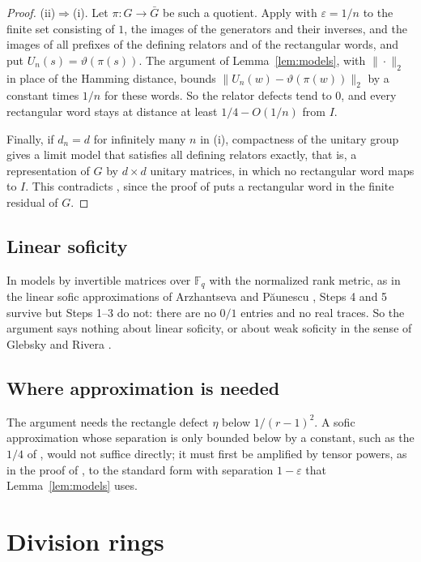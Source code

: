\documentclass[11pt]{article}
\theoremstyle{definition}
\theoremstyle{remark}
\numberwithin{equation}{section}
\newcommand{\F}{\mathbb F}
\newcommand{\eps}{\varepsilon}
\begin{document}
\begin{proof}
(ii)$\Rightarrow$(i). Let $\pi\colon G\to\bar G$ be such a quotient. Apply \cite[Theorem~3.6]{Pestov2008} with $\eps=1/n$ to the finite set consisting of $1$, the images of the generators and their inverses, and the images of all prefixes of the defining relators and of the rectangular words, and put $U_n(s)=\vartheta(\pi(s))$. The argument of Lemma~\ref{lem:models}, with $\|\cdot\|_2$ in place of the Hamming distance, bounds $\|U_n(w)-\vartheta(\pi(w))\|_2$ by a constant times $1/n$ for these words. So the relator defects tend to $0$, and every rectangular word stays at distance at least $1/4-O(1/n)$ from $I$.

Finally, if $d_n=d$ for infinitely many $n$ in (i), compactness of the unitary group gives a limit model that satisfies all defining relators exactly, that is, a representation of $G$ by $d\times d$ unitary matrices, in which no rectangular word maps to $I$. This contradicts \cite[Corollary~1.2]{OAI252}, since the proof of \cite[Theorem~1.1]{OAI252} puts a rectangular word in the finite residual of $G$.
\end{proof}

\subsection{Linear soficity}

 In models by invertible matrices over $\F_q$ with the normalized rank metric, as in the linear sofic approximations of Arzhantseva and P\u{a}unescu \cite{ArzhantsevaPaunescu2017}, Steps 4 and 5 survive but Steps 1--3 do not: there are no $0/1$ entries and no real traces. So the argument says nothing about linear soficity, or about weak soficity in the sense of Glebsky and Rivera \cite{GlebskyRivera2008}.

\subsection{Where approximation is needed}

The argument needs the rectangle defect $\eta$ below $1/(r-1)^2$. A sofic approximation whose separation is only bounded below by a constant, such as the $1/4$ of \cite[Theorem~3.5]{Pestov2008}, would not suffice directly; it must first be amplified by tensor powers, as in the proof of \cite[Theorem~1]{ElekSzabo2005}, to the standard form with separation $1-\eps$ that Lemma~\ref{lem:models} uses.

\section{Division rings}\label{sec:linnell}
\end{document}
